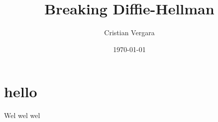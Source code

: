 \documentclass{article}
\author{Cristian Vergara}
\title{Breaking Diffie-Hellman}
\date{\today{}}
\begin{document}
  \maketitle{}
  \tableofcontents{}
  \newpage{}
  \section{hello}
    Wel wel wel \autocite{handbook}
  \newpage{}
  \printbibliography
\end{document}
